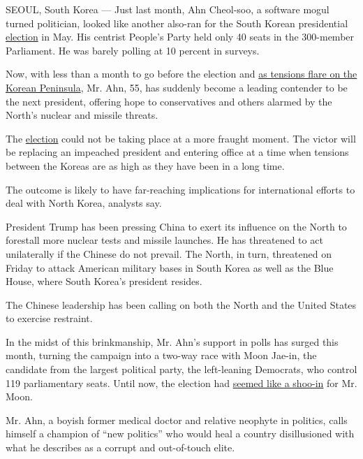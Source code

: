 SEOUL, South Korea --- Just last month, Ahn Cheol-soo, a software mogul
turned politician, looked like another also-ran for the South Korean
presidential
\href{https://www.nytimes.com/2020/04/10/world/asia/coronavirus-south-korea-election.html}{election}
in May. His centrist People's Party held only 40 seats in the 300-member
Parliament. He was barely polling at 10 percent in surveys.

Now, with less than a month to go before the election and
\href{https://www.nytimes.com/2017/04/14/world/asia/north-korea-china-nuclear.html}{as
tensions flare on the Korean Peninsula}, Mr. Ahn, 55, has suddenly
become a leading contender to be the next president, offering hope to
conservatives and others alarmed by the North's nuclear and missile
threats.

The
\href{https://www.nytimes.com/2020/04/10/world/asia/coronavirus-south-korea-election.html}{election}
could not be taking place at a more fraught moment. The victor will be
replacing an impeached president and entering office at a time when
tensions between the Koreas are as high as they have been in a long
time.

The outcome is likely to have far-reaching implications for
international efforts to deal with North Korea, analysts say.

President Trump has been pressing China to exert its influence on the
North to forestall more nuclear tests and missile launches. He has
threatened to act unilaterally if the Chinese do not prevail. The North,
in turn, threatened on Friday to attack American military bases in South
Korea as well as the Blue House, where South Korea's president resides.

The Chinese leadership has been calling on both the North and the United
States to exercise restraint.

In the midst of this brinkmanship, Mr. Ahn's support in polls has surged
this month, turning the campaign into a two-way race with Moon Jae-in,
the candidate from the largest political party, the left-leaning
Democrats, who control 119 parliamentary seats. Until now, the election
had
\href{https://www.nytimes.com/2017/03/10/world/asia/south-korea-liberals-impeachment.html}{seemed
like a shoo-in} for Mr. Moon.

Mr. Ahn, a boyish former medical doctor and relative neophyte in
politics, calls himself a champion of ``new politics'' who would heal a
country disillusioned with what he describes as a corrupt and
out-of-touch elite.

